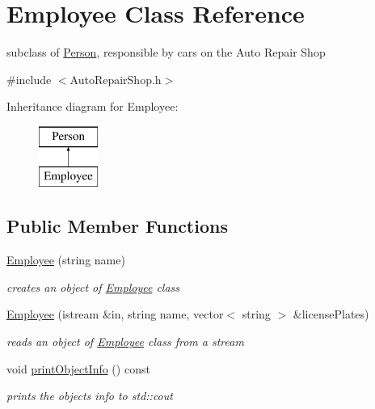 \hypertarget{class_employee}{}\section{Employee Class Reference}
\label{class_employee}


subclass of \hyperlink{class_person}{Person}, responsible by cars on the Auto Repair Shop  




{\ttfamily \#include $<$Auto\+Repair\+Shop.\+h$>$}

Inheritance diagram for Employee\+:\begin{figure}[H]
\begin{center}
\leavevmode
\includegraphics[height=2.000000cm]{class_employee}
\end{center}
\end{figure}
\subsection*{Public Member Functions}
\begin{DoxyCompactItemize}
\item 
\hypertarget{class_employee_a7ee153c7da11b23eb6bb7649fbb5797b}{}\hyperlink{class_employee_a7ee153c7da11b23eb6bb7649fbb5797b}{Employee} (string name)\label{class_employee_a7ee153c7da11b23eb6bb7649fbb5797b}

\begin{DoxyCompactList}\small\item\em creates an object of \hyperlink{class_employee}{Employee} class \end{DoxyCompactList}\item 
\hyperlink{class_employee_a494ea647c0cbeae14352add1e2e9dbf8}{Employee} (istream \&in, string name, vector$<$ string $>$ \&license\+Plates)
\begin{DoxyCompactList}\small\item\em reads an object of \hyperlink{class_employee}{Employee} class from a stream \end{DoxyCompactList}\item 
\hypertarget{class_employee_a1d85f1648beb9ba8921463948fd37273}{}void \hyperlink{class_employee_a1d85f1648beb9ba8921463948fd37273}{print\+Object\+Info} () const \label{class_employee_a1d85f1648beb9ba8921463948fd37273}

\begin{DoxyCompactList}\small\item\em prints the objects\textquotesingle{} info to std\+::cout \end{DoxyCompactList}\end{DoxyCompactItemize}

